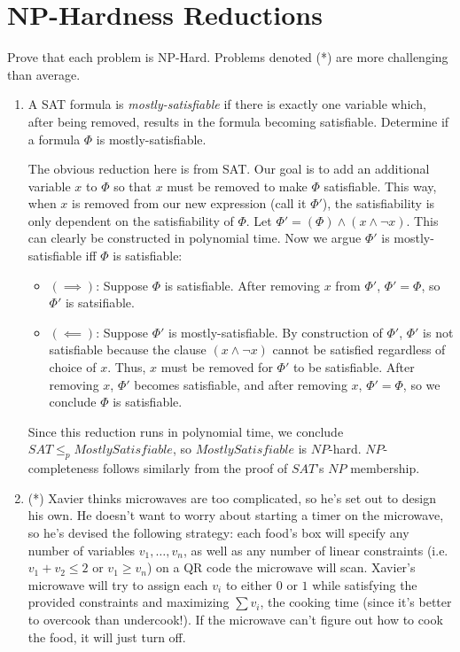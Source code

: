 \documentclass[fleqn]{article}
\begin{document}
\section{NP-Hardness Reductions}
Prove that each problem is NP-Hard. Problems denoted (*) are more challenging than average.
\begin{enumerate}
    \item A SAT formula is \textit{mostly-satisfiable} if there is exactly one variable which, after being removed, results in the formula becoming satisfiable. Determine if a formula $\Phi$ is mostly-satisfiable.
    \begin{answer}
        The obvious reduction here is from SAT.
        Our goal is to add an additional variable $x$ to $\Phi$ so that $x$ must be removed to make $\Phi$ satisfiable. This way, when $x$ is removed from our new expression (call it $\Phi'$), the satisfiability is only dependent on the satisfiability of $\Phi$. Let $\Phi' = (\Phi) \wedge (x \wedge \neg x)$. This can clearly be constructed in polynomial time. Now we argue $\Phi'$ is mostly-satisfiable iff $\Phi$ is satisfiable:
        \begin{itemize}
            \item $(\implies)$: Suppose $\Phi$ is satisfiable. After removing $x$ from $\Phi'$, $\Phi' = \Phi$, so $\Phi'$ is satsifiable.
            \item $(\impliedby)$: Suppose $\Phi'$ is mostly-satisfiable. By construction of $\Phi'$, $\Phi'$ is not satisfiable because the clause $(x \wedge \neg x)$ cannot be satisfied regardless of choice of $x$. Thus, $x$ must be removed for $\Phi'$ to be satisfiable. After removing $x$, $\Phi'$ becomes satisfiable, and after removing $x$, $\Phi' = \Phi$, so we conclude $\Phi$ is satisfiable.
        \end{itemize}
        Since this reduction runs in polynomial time, we conclude $SAT \leq_p MostlySatisfiable$, so $MostlySatisfiable$ is $NP$-hard. $NP$-completeness follows similarly from the proof of $SAT$'s $NP$ membership.
    \end{answer}
    \item (*) Xavier thinks microwaves are too complicated, so he's set out to design his own. He doesn't want to worry about starting a timer on the microwave, so he's devised the following strategy: each food's box will specify any number of variables $v_1, \dots, v_n$, as well as any number of linear constraints (i.e. $v_1 + v_2 \le 2$ or $v_1 \geq v_n$) on a QR code the microwave will scan. Xavier's microwave will try to assign each $v_i$ to either $0$ or $1$ while satisfying the provided constraints and maximizing $\sum v_i$, the cooking time (since it's better to overcook than undercook!). If the microwave can't figure out how to cook the food, it will just turn off.

\end{enumerate}
\end{document}
